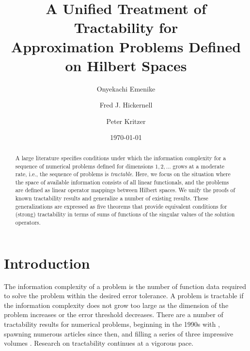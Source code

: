 \documentclass[sort&compress]{elsarticle}
\begin{document}
\title{A Unified Treatment of Tractability for \\ Approximation Problems Defined on Hilbert Spaces}

\author[1]{Onyekachi Emenike}
\author[1]{Fred J. Hickernell}
\author[2]{Peter Kritzer}


\date{\today}


\begin{abstract}
    A large literature specifies conditions under which the information complexity for a sequence of numerical problems defined for dimensions $1, 2, \ldots$ grows at a moderate rate, i.e., the sequence of problems is \emph{tractable}.  Here, we focus on the situation where the space of available information consists of all linear functionals, and the problems are defined as linear operator mappings between Hilbert spaces.  We unify the proofs of known tractability results and generalize a number of existing results.  These generalizations are expressed as five theorems that provide equivalent conditions for (strong) tractability in terms of sums of functions of the singular values of the solution operators.
\end{abstract}

\maketitle




\section{Introduction}


\noindent The information complexity of a problem is the number of function data required to solve the problem within the desired error tolerance.  A problem is tractable if the information complexity does not grow too large as the dimension of the problem increases or the error threshold decreases.  There are a number of tractability results for numerical problems, beginning in the 1990s with \cite{W94a,W94b}, spawning numerous articles since then, and filling a series of three impressive volumes \cite{NovWoz08a,NovWoz10a,NovWoz12a}.  Research on tractability continues at a vigorous pace. 
\end{document}
